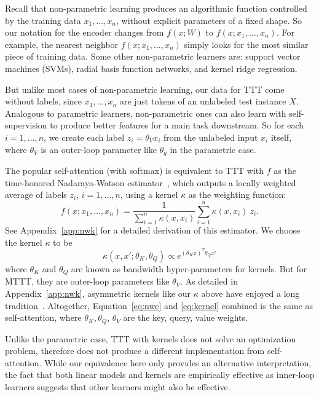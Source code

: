 \documentclass{article} %
\begin{document}
Recall that non-parametric learning produces an algorithmic function controlled by the training data $x_1, \dots, x_n$, without explicit parameters of a fixed shape.
So our notation for the encoder changes from $f(x; W)$ to $f(x; x_1, \dots, x_n)$.
For example, the nearest neighbor $f(x; x_1, \dots, x_n)$ simply looks for the most similar piece of training data.
Some other non-parametric learners are: support vector machines (SVMs), radial basis function networks, and kernel ridge regression.

But unlike most cases of non-parametric learning, our data for TTT come without labels, since $x_1, \dots, x_n$ are just tokens of an unlabeled test instance $X$. 
Analogous to parametric learners, non-parametric ones can also learn with self-supervision to produce better features for a main task downstream.
So for each $i=1,\dots,n$, we create each label $z_i = \theta_V x_i$ from the unlabeled input $x_i$ itself, where $\theta_V$ is an outer-loop parameter like $\theta_g$ in the parametric case.

The popular self-attention (with softmax) is equivalent to TTT with $f$ as the time-honored Nadaraya-Watson estimator~\citep{bierens1988nadaraya, cai2001weighted}, which outputs a locally weighted average of labels $z_i$, $i=1,\dots,n$, using a kernel $\kappa$ as the weighting function:
\begin{equation}
\label{eq:nwe}
    f(x; x_1, \dots, x_n) = \frac{1}{\sum_{i=1}^n \kappa(x, x_i)} \sum_{i=1}^n \kappa(x, x_i) ~z_i.
\end{equation}
See Appendix~\ref{app:nwk} for a detailed derivation of this estimator.
We choose the kernel $\kappa$ to be
\begin{equation}
\label{eq:kernel}
\kappa(x, x'; \theta_K, \theta_Q) \propto e^{(\theta_Kx)^T \theta_Qx'}
\end{equation}
where $\theta_K$ and $\theta_Q$ are known as bandwidth hyper-parameters for kernels. But for MTTT, they are outer-loop parameters like $\theta_V$.
As detailed in Appendix~\ref{app:nwk},
asymmetric kernels like our $\kappa$ above have enjoyed a long tradition~\citep{breiman1977variable,chen2017tutorial}.
Altogether, Equation~\ref{eq:nwe} and \ref{eq:kernel} combined is the same as self-attention, where $\theta_K, \theta_Q$, $\theta_V$ are the key, query, value weights.

Unlike the parametric case, TTT with kernels does not solve an optimization problem, therefore does not produce a different implementation from self-attention.
While our equivalence here only provides an alternative interpretation, the fact that both linear models and kernels are empirically effective as inner-loop learners suggests that other learners might also be effective.
\end{document}
